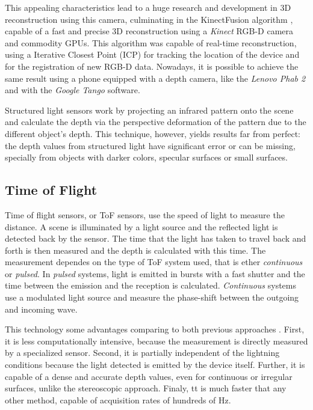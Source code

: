 This appealing characteristics lead to a huge research and development in 3D reconstruction using this camera, culminating in the KinectFusion algorithm \cite{kinectfusion2011}, capable of a fast and precise 3D reconstruction using a \textit{Kinect} RGB-D camera and commodity GPUs. This algorithm was capable of real-time reconstruction, using a Iterative Closest Point (ICP) for tracking the location of the device and for the registration of new RGB-D data. Nowadays, it is possible to achieve the same result using a phone equipped with a depth camera, like the \textit{Lenovo Phab 2} and with the \textit{Google Tango} software. 

Structured light sensors work by projecting an infrared pattern onto the scene and calculate the depth via the perspective deformation of the pattern due to the different object's depth. This technique, however, yields results far from perfect: the depth values from structured light have significant error or can be missing, specially from objects with darker colors, specular surfaces or small surfaces\cite{shen2013}. 

\subsection{Time of Flight}

Time of flight sensors, or ToF sensors, use the speed of light to measure the distance. A scene is illuminated by a light source and the reflected light is detected back by the sensor. The time that the light has taken to travel back and forth is then measured and the depth is calculated with this time. The measurement dependes on the type of ToF system used, that is ether \textit{continuous} or \textit{pulsed}. In \textit{pulsed} systems, light is emitted in bursts with a fast shutter and the time between the emission and the reception is calculated. \textit{Continuous} systems use a modulated light source and measure the phase-shift between the outgoing and incoming wave.

This technology some advantages comparing to both previous approaches \cite{zollhoefer2018}. First, it is less computationally intensive, because the measurement is directly measured by a specialized sensor. Second, it is partially independent of the lightning conditions because the light detected is emitted by the device itself. Further, it is capable of a dense and accurate depth values, even for continuous or irregular surfaces, unlike the stereoscopic approach. Finaly, tt is much faster that any other method, capable of acquisition rates of hundreds of \si{\hertz}.

